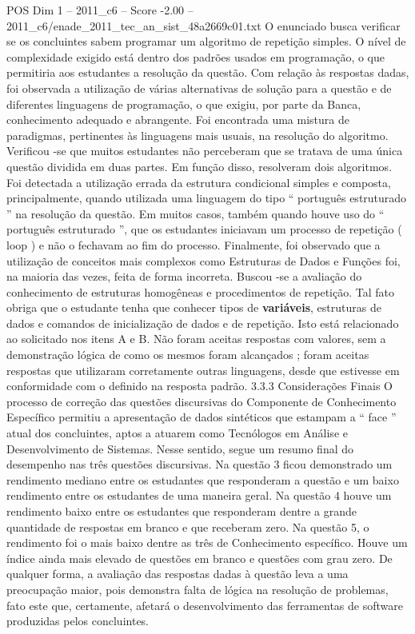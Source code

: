 \begin{textsample}{POS Dim 1 – 2011\_c6 – Score -2.00 – 2011\_c6/enade\_2011\_tec\_an\_sist\_48a2669c01.txt}
O enunciado busca verificar se os concluintes sabem programar um algoritmo de repetição simples.
O nível de complexidade exigido está dentro dos padrões usados em programação, o que permitiria aos estudantes a resolução da questão.
Com relação às respostas dadas, foi observada a utilização de várias alternativas de solução para a questão e de diferentes linguagens de programação, o que exigiu, por parte da Banca, conhecimento adequado e abrangente.
Foi encontrada uma mistura de paradigmas, pertinentes às linguagens mais usuais, na resolução do algoritmo.
Verificou -se que muitos estudantes não perceberam que se tratava de uma única questão dividida em duas partes.
Em função disso, resolveram dois algoritmos.
Foi detectada a utilização errada da estrutura condicional simples e composta, principalmente, quando utilizada uma linguagem do tipo “ português estruturado ” na resolução da questão.
Em muitos casos, também quando houve uso do “ português estruturado ”, que os estudantes iniciavam um processo de repetição ( loop ) e não o fechavam ao fim do processo.
Finalmente, foi observado que a utilização de conceitos mais complexos como Estruturas de Dados e Funções foi, na maioria das vezes, feita de forma incorreta.
Buscou -se a avaliação do conhecimento de estruturas homogêneas e procedimentos de repetição.
Tal fato obriga que o estudante tenha que conhecer tipos de \textbf{variáveis}, estruturas de dados e comandos de inicialização de dados e de repetição.
Isto está relacionado ao solicitado nos itens A e B.
Não foram aceitas respostas com valores, sem a demonstração lógica de como os mesmos foram alcançados ; foram aceitas respostas que utilizaram corretamente outras linguagens, desde que estivesse em conformidade com o definido na resposta padrão. 3.3.3 Considerações Finais O processo de correção das questões discursivas do Componente de Conhecimento Específico permitiu a apresentação de dados sintéticos que estampam a “ face ” atual dos concluintes, aptos a atuarem como Tecnólogos em Análise e Desenvolvimento de Sistemas.
Nesse sentido, segue um resumo final do desempenho nas três questões discursivas.
Na questão 3 ficou demonstrado um rendimento mediano entre os estudantes que responderam a questão e um baixo rendimento entre os estudantes de uma maneira geral.
Na questão 4 houve um rendimento baixo entre os estudantes que responderam dentre a grande quantidade de respostas em branco e que receberam zero.
Na questão 5, o rendimento foi o mais baixo dentre as três de Conhecimento específico.
Houve um índice ainda mais elevado de questões em branco e questões com grau zero.
De qualquer forma, a avaliação das respostas dadas à questão leva a uma preocupação maior, pois demonstra falta de lógica na resolução de problemas, fato este que, certamente, afetará o desenvolvimento das ferramentas de software produzidas pelos concluintes.

\end{textsample}
